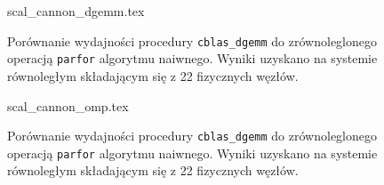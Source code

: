 \begin{figure}[hb]
\centering
\footnotesize
{scal_cannon_dgemm.tex}
\caption{Porównanie wydajności procedury \texttt{cblas\_dgemm} do zrównoleglonego operacją \texttt{parfor} algorytmu naiwnego. Wyniki uzyskano na systemie równoległym składającym się z 22 fizycznych węzłów.}
\label{pl:mono}
\end{figure}

\begin{figure}[hb]
\centering
\footnotesize
{scal_cannon_omp.tex}
\caption{Porównanie wydajności procedury \texttt{cblas\_dgemm} do zrównoleglonego operacją \texttt{parfor} algorytmu naiwnego. Wyniki uzyskano na systemie równoległym składającym się z 22 fizycznych węzłów.}
\label{pl:mono}
\end{figure}